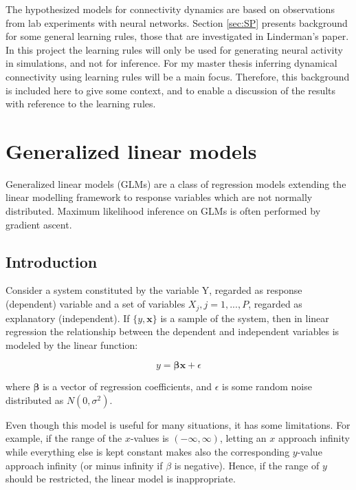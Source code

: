 The hypothesized models for connectivity dynamics are based on observations from lab experiments with neural networks. Section \ref{sec:SP} presents background for some general learning rules, those that are investigated in Linderman's paper. In this project the learning rules will only be used for generating neural activity in simulations, and not for inference. For my master thesis inferring dynamical connectivity using learning rules will be a main focus. Therefore, this background is included here to give some context, and to enable a discussion of the results with reference to the learning rules.

\section{Generalized linear models}
\label{sec:stats}

Generalized linear models (GLMs) are a class of regression models extending the linear modelling framework to response variables which are not normally distributed. Maximum likelihood inference on GLMs is often performed by gradient ascent.

\subsection{Introduction}
\label{Intro_GLM}
Consider a system constituted by the variable Y, regarded as response (dependent) variable and a set of variables ${X_j}, {j=1,...,P}$, regarded as explanatory (independent). If $\{y,\mathbf{x}\}$ is a sample of the system, then in  linear regression the relationship between the dependent and independent variables is modeled by the linear function:

\begin{equation}
\label{eq:general}
    y = \bm{ \beta} \mathbf{x} + \epsilon
\end{equation}

where $\bm{\beta}$ is a vector of regression coefficients, and $\epsilon$ is some random noise distributed as $N(0, \sigma^{2})$. 

Even though this model is useful for many situations, it has some limitations. For example, if the range of the $x$-values is $(-\infty, \infty)$, letting an $x$ approach infinity while everything else is kept constant makes also the corresponding $y$-value approach infinity (or minus infinity if $\beta$ is negative). Hence, if the range of $y$ should be restricted, the linear model is inappropriate. 

